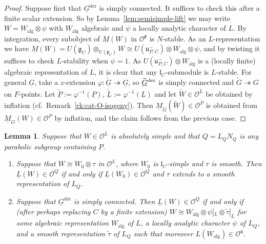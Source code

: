 \documentclass[a4paper]{amsart}
\numberwithin{equation}{section}
\newtheorem{lem}[thm]{Lemma}
\theoremstyle{remark}
\theoremstyle{definition}
\newcommand{\alggrp}[1]{\underline{#1}}
\newcommand{\der}{\mathrm{der}}
\newcommand{\alg}{\mathrm{alg}}
\newcommand{\onto}{\twoheadrightarrow}
\newcommand{\lowprime}[1][\prime]{
  \mathchoice
    {\raisebox{-0.7ex}{$\scriptstyle #1$}}
    {\raisebox{-0.7ex}{$\scriptstyle #1$}}
    {\raisebox{-0.7ex}{$\scriptstyle #1$}}
    {\raisebox{-0.3ex}{$\scriptscriptstyle #1$}}
}
\newcommand{\wt}[1]{\widetilde{#1}}
\begin{document}
\begin{proof}
  Suppose first that $\alggrp{G}^{\der}$ is simply connected.
  It suffices to check this after a finite scalar extension. So by Lemma~\ref{lem:semisimple-lift} we may write $W = W_\alg \otimes \psi$
  with $W_\alg$ algebraic and $\psi$ a locally analytic character of $L$. By integration, every subobject of $\underline{M}(W)$ in $\mathcal{O}^{\mathfrak{p}}$ is $N$-stable.
  As an $L$-representation we have $\underline{M}(W) = U(\mathfrak{g}_{C}) \otimes_{U(\mathfrak{p}_{C})} W \cong U(\mathfrak{u}_{P,C}^{-}) \otimes W_\alg \otimes \psi$, and by twisting it suffices
  to check $L$-stability when $\psi = 1$. As $U(\mathfrak{u}_{P,C}^{-}) \otimes W_\alg$ is a (locally finite) algebraic representation of $L$,
  it is clear that any $\mathfrak{l}_{C}$-submodule is $L$-stable.
  For general $\alggrp G$, take a $z$-extension $\varphi : \wt {\alggrp G} \onto \alggrp G$, so $\wt {\alggrp G}^{\lowprime[\der]}$ is simply connected and $\wt G \onto G$ on $F$-points.
  Let $\wt{\alggrp P} := \varphi^{-1}(\alggrp P)$, $\wt{\alggrp L} := \varphi^{-1}(\alggrp L)$ and let $\wt W \in \mathcal O^{\wt L}$ be obtained by inflation (cf.\ Remark~\ref{rk:cat-O-isogeny}).
  Then $\underline M_{\wt G}(\wt W) \in \mathcal O^{\wt P}$ is obtained from $\underline M_{G}(W) \in \mathcal O^{P}$ by inflation, and the claim follows from the previous case.
\end{proof}






\begin{lem}\label{lem:simple-in-O-Q}
  Suppose that $W \in \mathcal{O}^{L}$ is absolutely simple and that $Q = L_Q N_Q$ is any parabolic subgroup containing $P$.
  \begin{enumerate}
  \item 
    Suppose that $W \cong W_0 \otimes \tau$ in $\mathcal O^L$, where $W_0$ is $\mathfrak l_C$-simple and $\tau$ is smooth.     Then $\underline L(W) \in {\mathcal O}^Q$ if and only if $\underline L(W_0) \in {\mathcal O}^{Q}$ and $\tau$ extends to a smooth representation of $L_Q$.
  \item   
    Suppose that $\alggrp{G}^{\der}$ is simply connected. 
    Then $\underline L(W) \in {\mathcal O}^Q$ if and only if (after perhaps replacing $C$ by a finite extension) $W \cong W_\alg \otimes \psi|_L \otimes \wt\tau|_L$ for some algebraic representation $W_\alg$ of $L$, a locally analytic character $\psi$ of $L_Q$, and a smooth representation $\wt\tau$ of $L_Q$ such that moreover $L(W_\alg) \in {\mathcal O}^{\mathfrak{q}}$.
  \end{enumerate}
\end{lem}
\end{document}
